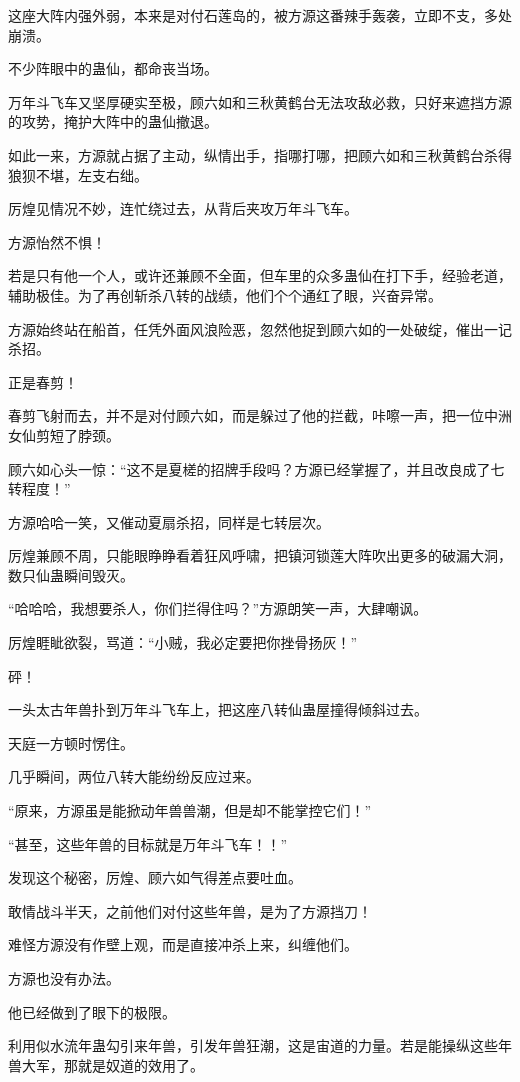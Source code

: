 \begin{this_body}
这座大阵内强外弱，本来是对付石莲岛的，被方源这番辣手轰袭，立即不支，多处崩溃。

不少阵眼中的蛊仙，都命丧当场。

万年斗飞车又坚厚硬实至极，顾六如和三秋黄鹤台无法攻敌必救，只好来遮挡方源的攻势，掩护大阵中的蛊仙撤退。

如此一来，方源就占据了主动，纵情出手，指哪打哪，把顾六如和三秋黄鹤台杀得狼狈不堪，左支右绌。

厉煌见情况不妙，连忙绕过去，从背后夹攻万年斗飞车。

方源怡然不惧！

若是只有他一个人，或许还兼顾不全面，但车里的众多蛊仙在打下手，经验老道，辅助极佳。为了再创斩杀八转的战绩，他们个个通红了眼，兴奋异常。

方源始终站在船首，任凭外面风浪险恶，忽然他捉到顾六如的一处破绽，催出一记杀招。

正是春剪！

春剪飞射而去，并不是对付顾六如，而是躲过了他的拦截，咔嚓一声，把一位中洲女仙剪短了脖颈。

顾六如心头一惊：“这不是夏槎的招牌手段吗？方源已经掌握了，并且改良成了七转程度！”

方源哈哈一笑，又催动夏扇杀招，同样是七转层次。

厉煌兼顾不周，只能眼睁睁看着狂风呼啸，把镇河锁莲大阵吹出更多的破漏大洞，数只仙蛊瞬间毁灭。

“哈哈哈，我想要杀人，你们拦得住吗？”方源朗笑一声，大肆嘲讽。

厉煌睚眦欲裂，骂道：“小贼，我必定要把你挫骨扬灰！”

砰！

一头太古年兽扑到万年斗飞车上，把这座八转仙蛊屋撞得倾斜过去。

天庭一方顿时愣住。

几乎瞬间，两位八转大能纷纷反应过来。

“原来，方源虽是能掀动年兽兽潮，但是却不能掌控它们！”

“甚至，这些年兽的目标就是万年斗飞车！！”

发现这个秘密，厉煌、顾六如气得差点要吐血。

敢情战斗半天，之前他们对付这些年兽，是为了方源挡刀！

难怪方源没有作壁上观，而是直接冲杀上来，纠缠他们。

方源也没有办法。

他已经做到了眼下的极限。

利用似水流年蛊勾引来年兽，引发年兽狂潮，这是宙道的力量。若是能操纵这些年兽大军，那就是奴道的效用了。


\end{this_body}
